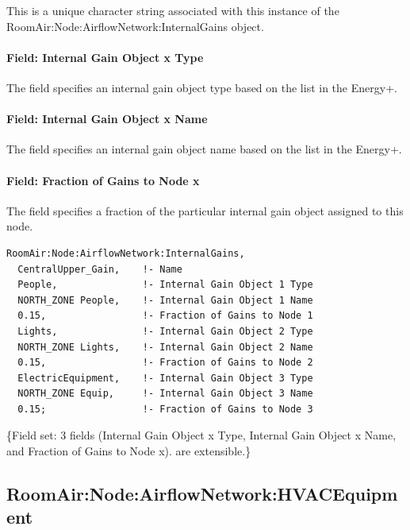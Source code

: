 This is a unique character string associated with this instance of the Room\-Air:\-Node:\-Air\-flow\-Net\-work:\-Internal\-Gains object.

\paragraph{Field: Internal Gain Object x Type}\label{field-internal-gain-object-x-type}

The field specifies an internal gain object type based on the list in the Energy+.

\paragraph{Field: Internal Gain Object x Name}\label{field-internal-gain-object-x-name}

The field specifies an internal gain object name based on the list in the Energy+.

\paragraph{Field: Fraction of Gains to Node x}\label{field-fraction-of-gains-to-node-x}

The field specifies a fraction of the particular internal gain object assigned to this node.

\begin{lstlisting}
RoomAir:Node:AirflowNetwork:InternalGains,
  CentralUpper_Gain,    !- Name
  People,               !- Internal Gain Object 1 Type
  NORTH_ZONE People,    !- Internal Gain Object 1 Name
  0.15,                 !- Fraction of Gains to Node 1
  Lights,               !- Internal Gain Object 2 Type
  NORTH_ZONE Lights,    !- Internal Gain Object 2 Name
  0.15,                 !- Fraction of Gains to Node 2
  ElectricEquipment,    !- Internal Gain Object 3 Type
  NORTH_ZONE Equip,     !- Internal Gain Object 3 Name
  0.15;                 !- Fraction of Gains to Node 3
\end{lstlisting}

\{Field set: 3 fields (Internal Gain Object x Type, Internal Gain Object x Name, and Fraction of Gains to Node x). are extensible.\}

\subsection{RoomAir:Node:AirflowNetwork:HVACEquipment}\label{roomairnodeairflownetworkhvacequipment}

